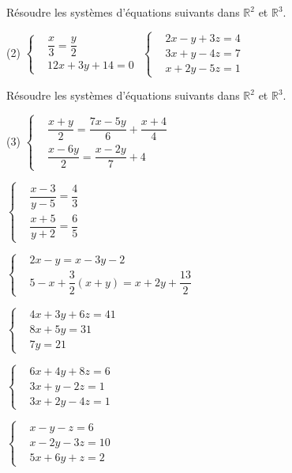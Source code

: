 \documentclass[a4paper,12pt]{report}
\begin{document}
\begin{exo}[2]
Résoudre les systèmes d'équations suivants dans $\mathbb{R}^2$ et $\mathbb{R}^3$.
\begin{tasks}(2)
\task
  $\left\{
    \begin{aligned}
      & \dfrac{x}{3} = \dfrac{y}{2} \\
      & 12x + 3y + 14 = 0
    \end{aligned}
  \right.$
\task
$
  \left\{
    \begin{aligned}
      & 2x - y + 3z = 4 \\
      & 3x + y - 4z = 7 \\
      & x + 2y - 5z = 1
    \end{aligned}
  \right.
$
\end{tasks}
\end{exo}
\begin{exo}[3]
Résoudre les systèmes d'équations suivants dans $\mathbb{R}^2$ et $\mathbb{R}^3$.
\begin{tasks}(3)
\task
$
  \left\{
    \begin{aligned}
      & \dfrac{x+y}{2} = \dfrac{7x - 5y}{6} + \dfrac{x+4}{4} \\
      & \dfrac{x - 6y}{2} = \dfrac{x - 2y}{7} + 4
    \end{aligned}
  \right.
$

\task
$
  \left\{
    \begin{aligned}
      & \dfrac{x-3}{y-5} = \dfrac{4}{3} \\
      & \dfrac{x+5}{y+2} = \dfrac{6}{5}
    \end{aligned}
  \right.
$

\task
$
  \left\{
    \begin{aligned}
      & 2x - y = x - 3y - 2 \\
      & 5 - x + \dfrac{3}{2}(x + y) = x + 2y + \dfrac{13}{2}
    \end{aligned}
  \right.
$

\task
$
  \left\{
    \begin{aligned}
      & 4x + 3y + 6z = 41 \\
      & 8x + 5y = 31 \\
      & 7y = 21
    \end{aligned}
  \right.
$

\task
$
  \left\{
    \begin{aligned}
      & 6x + 4y + 8z = 6 \\
      & 3x + y - 2z = 1 \\
      & 3x + 2y - 4z = 1
    \end{aligned}
  \right.
$

\task
$
  \left\{
    \begin{aligned}
      & x - y - z = 6 \\
      & x - 2y - 3z = 10 \\
      & 5x + 6y + z = 2
    \end{aligned}
  \right.
$

\end{tasks}
\end{exo}
\end{document}
